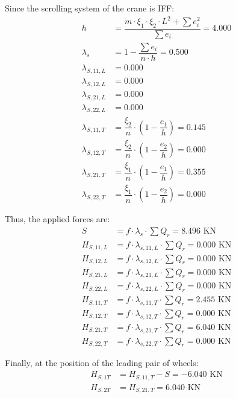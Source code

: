 \documentclass[a4paper,10pt, final, oneside, fleqn, onecolumn]{article}	%
\begin{document}
Since the scrolling system of the crane is IFF:
\begin{align*}
    h                &= \dfrac{m \cdot \xi_1 \cdot \xi_2 \cdot L^2 + \sum{e_i^2}}{\sum{e_i}} = 4.000 \\
    \lambda_s        &= 1 - \dfrac{\sum{e_i}}{n \cdot h} =  0.500 \\
    \lambda_{S,11,L} &= 0.000 \\
    \lambda_{S,12,L} &= 0.000 \\
    \lambda_{S,21,L} &= 0.000 \\
    \lambda_{S,22,L} &= 0.000 \\
    \lambda_{S,11,T} &= \dfrac{\xi_2}{n} \cdot \left(1 - \dfrac{e_1}{h}\right) = 0.145 \\
    \lambda_{S,12,T} &= \dfrac{\xi_2}{n} \cdot \left(1 - \dfrac{e_2}{h}\right) = 0.000 \\
    \lambda_{S,21,T} &= \dfrac{\xi_1}{n} \cdot \left(1 - \dfrac{e_1}{h}\right) = 0.355 \\
    \lambda_{S,22,T} &= \dfrac{\xi_1}{n} \cdot \left(1 - \dfrac{e_2}{h}\right) = 0.000
\end{align*}

Thus, the applied forces are:
\begin{align*} %
    S                &= f \cdot \lambda_s \cdot \sum{Q_r} = 8.496 \text{ KN} \\
    H_{S,11,L}       &= f \cdot \lambda_{s,11,L} \cdot \sum{Q_r} = 0.000 \text{ KN} \\
    H_{S,12,L}       &= f \cdot \lambda_{s,12,L} \cdot \sum{Q_r} = 0.000 \text{ KN} \\
    H_{S,21,L}       &= f \cdot \lambda_{s,21,L} \cdot \sum{Q_r} = 0.000 \text{ KN} \\
    H_{S,22,L}       &= f \cdot \lambda_{s,22,L} \cdot \sum{Q_r} = 0.000 \text{ KN} \\
    H_{S,11,T}       &= f \cdot \lambda_{s,11,T} \cdot \sum{Q_r} = 2.455 \text{ KN} \\
    H_{S,12,T}       &= f \cdot \lambda_{s,12,T} \cdot \sum{Q_r} = 0.000 \text{ KN} \\
    H_{S,21,T}       &= f \cdot \lambda_{s,21,T} \cdot \sum{Q_r} = 6.040 \text{ KN} \\
    H_{S,22,T}       &= f \cdot \lambda_{s,22,T} \cdot \sum{Q_r} = 0.000 \text{ KN}
\end{align*}

Finally, at the position of the leading pair of wheels:
\begin{align*}
    H_{S,1T} &= H_{S,11,T} - S = -6.040 \text{ KN} \\
    H_{S,2T} &= H_{S,21,T} = 6.040 \text{ KN}
\end{align*}
\end{document}
